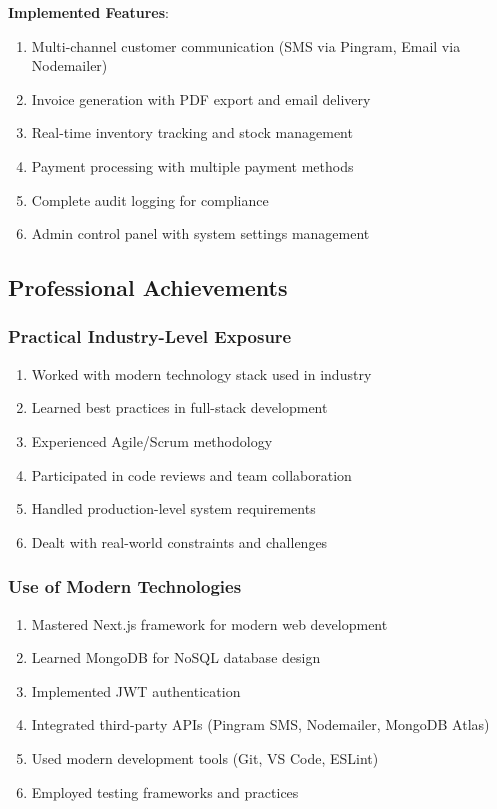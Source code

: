 \documentclass[12pt,a4paper]{report}
\begin{document}
\textbf{Implemented Features}:
\begin{enumerate}[label=\roman*)]
    \item Multi-channel customer communication (SMS via Pingram, Email via Nodemailer)
    \item Invoice generation with PDF export and email delivery
    \item Real-time inventory tracking and stock management
    \item Payment processing with multiple payment methods
    \item Complete audit logging for compliance
    \item Admin control panel with system settings management
\end{enumerate}

\subsection{Professional Achievements}

\subsubsection{Practical Industry-Level Exposure}

\begin{enumerate}[label=\roman*)]
    \item Worked with modern technology stack used in industry
    \item Learned best practices in full-stack development
    \item Experienced Agile/Scrum methodology
    \item Participated in code reviews and team collaboration
    \item Handled production-level system requirements
    \item Dealt with real-world constraints and challenges
\end{enumerate}

\subsubsection{Use of Modern Technologies}

\begin{enumerate}[label=\roman*)]
    \item Mastered Next.js framework for modern web development
    \item Learned MongoDB for NoSQL database design
    \item Implemented JWT authentication
    \item Integrated third-party APIs (Pingram SMS, Nodemailer, MongoDB Atlas)
    \item Used modern development tools (Git, VS Code, ESLint)
    \item Employed testing frameworks and practices
\end{enumerate}
\end{document}
